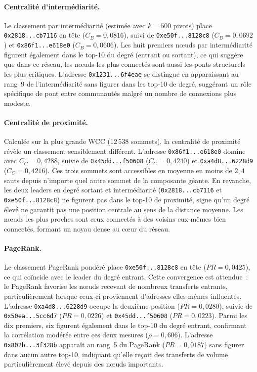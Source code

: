 \paragraph{Centralit\'e d'interm\'ediarit\'e.}
Le classement par interm\'ediarit\'e (estim\'ee avec $k = 500$ pivots) place \texttt{0x2818...cb7116} en t\^ete ($C_B = 0{,}0816$), suivi de \texttt{0xe50f...8128c8} ($C_B = 0{,}0692$) et \texttt{0x86f1...e618e0} ($C_B = 0{,}0606$). Les huit premiers n\oe{}uds par interm\'ediarit\'e figurent \'egalement dans le top-10 du degr\'e (entrant ou sortant), ce qui sugg\`ere que dans ce r\'eseau, les n\oe{}uds les plus connect\'es sont aussi les ponts structurels les plus critiques. L'adresse \texttt{0x1231...6f4eae} se distingue en apparaissant au rang~9 de l'interm\'ediarit\'e sans figurer dans les top-10 de degr\'e, sugg\'erant un r\^ole sp\'ecifique de pont entre communaut\'es malgr\'e un nombre de connexions plus modeste.

\paragraph{Centralit\'e de proximit\'e.}
Calcul\'ee sur la plus grande WCC ($12\,538$ sommets), la centralit\'e de proximit\'e r\'ev\`ele un classement sensiblement diff\'erent. L'adresse \texttt{0x86f1...e618e0} domine avec $C_C = 0{,}4288$, suivie de \texttt{0x45dd...f50608} ($C_C = 0{,}4240$) et \texttt{0xa4d8...6228d9} ($C_C = 0{,}4216$). Ces trois sommets sont accessibles en moyenne en moins de $2{,}4$ sauts depuis n'importe quel autre sommet de la composante g\'eante. En revanche, les deux leaders en degr\'e sortant et interm\'ediarit\'e (\texttt{0x2818...cb7116} et \texttt{0xe50f...8128c8}) ne figurent pas dans le top-10 de proximit\'e, signe qu'un degr\'e \'elev\'e ne garantit pas une position centrale au sens de la distance moyenne. Les n\oe{}uds les plus proches sont ceux connect\'es \`a des voisins eux-m\^emes bien connect\'es, formant un noyau dense au c\oe{}ur du r\'eseau.

\paragraph{PageRank.}
Le classement PageRank pond\'er\'e place \texttt{0xe50f...8128c8} en t\^ete ($PR = 0{,}0425$), ce qui co\"incide avec le leader du degr\'e entrant. Cette convergence est attendue~: le PageRank favorise les n\oe{}uds recevant de nombreux transferts entrants, particuli\`erement lorsque ceux-ci proviennent d'adresses elles-m\^emes influentes. L'adresse \texttt{0xa4d8...6228d9} occupe la deuxi\`eme position ($PR = 0{,}0280$), suivie de \texttt{0x50ea...5cc6d7} ($PR = 0{,}0226$) et \texttt{0x45dd...f50608} ($PR = 0{,}0223$). Parmi les dix premiers, six figurent \'egalement dans le top-10 du degr\'e entrant, confirmant la corr\'elation mod\'er\'ee entre ces deux mesures ($\rho = 0{,}606$). L'adresse \texttt{0x802b...3f328b} appara\^it au rang~5 du PageRank ($PR = 0{,}0187$) sans figurer dans aucun autre top-10, indiquant qu'elle re\c{c}oit des transferts de volume particuli\`erement \'elev\'e depuis des n\oe{}uds importants.

